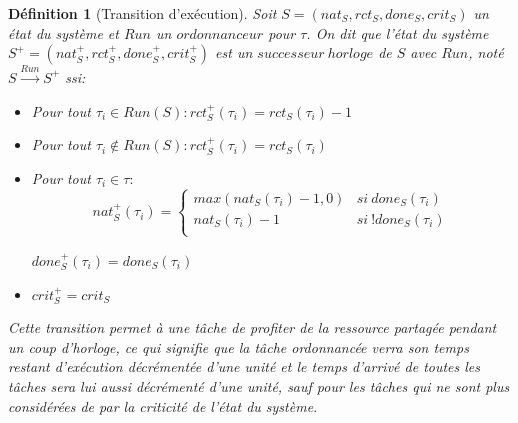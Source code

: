 \documentclass[11pt,a4paper,oneside]{book}
\theoremstyle{break}
\newtheorem{defin}{Définition}
\theoremstyle{breakplain}
\begin{document}
\begin{defin}[Transition d'exécution]
\label{texec}
Soit $S = (nat_S, rct_S, done_S, crit_S)$ un état du système et $Run$ un $ordonnanceur$ pour $\tau$. On dit que l'état du système $S^+ = (nat_S^+, rct_S^+, done_S^+, crit_S^+)$ est un $successeur\ horloge$ de $S$ avec $Run$, noté $S\xrightarrow{Run}S^+$ ssi:
\begin{itemize}
\item Pour tout $\tau_i \in Run(S) : rct_S^+(\tau_i) = rct_S(\tau_i)-1$\\
\item Pour tout $\tau_i \not \in Run(S) : rct_S^+(\tau_i) = rct_S(\tau_i)$\\
\item Pour tout $\tau_i \in \tau :$
$$ nat_S^+(\tau_i) = \left\{
    \begin{array}{ll}
        max(nat_S(\tau_i)-1, 0) & si\ done_S(\tau_i) \\
        nat_S(\tau_i)-1 & si\ !done_S(\tau_i) \\
    \end{array}
\right.
$$
\begin{center}
$done_{S}^{+}(\tau_i) = done_{S}(\tau_i)$

\end{center}
\item $crit_{S}^{+} = crit_{S}$

\end{itemize}
Cette transition permet à une tâche de profiter de la ressource partagée pendant un coup d'horloge, ce qui signifie que la tâche ordonnancée verra son temps restant d'exécution décrémentée d'une unité et le temps d'arrivé de toutes les tâches sera lui aussi décrémenté d'une unité, sauf pour les tâches qui ne sont plus considérées de par la criticité de l'état du système.
\end{defin}
\end{document}

